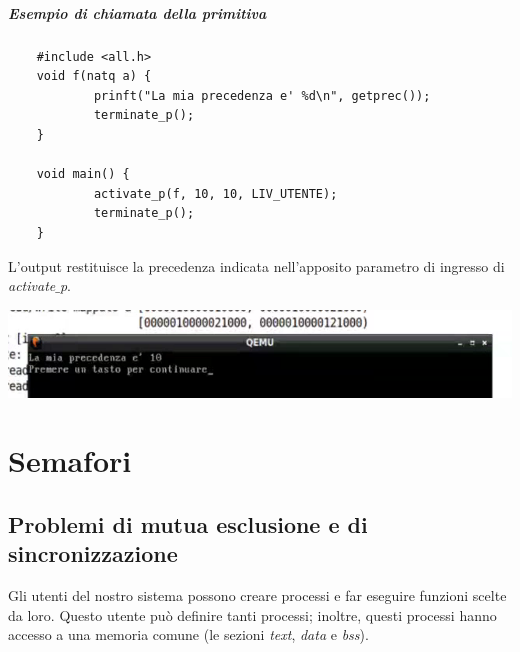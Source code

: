 \documentclass[11pt]{report}
\theoremstyle{definition}
\begin{document}
\paragraph{Esempio di chiamata della primitiva}
\begin{verbatim}
	#include <all.h>
	void f(natq a) {
		    prinft("La mia precedenza e' %d\n", getprec());
		    terminate_p();
	}
	
	void main() {
		    activate_p(f, 10, 10, LIV_UTENTE);
		    terminate_p();
	}
\end{verbatim}
L'output restituisce la precedenza indicata nell'apposito parametro di ingresso di \emph{activate$\_$p}.
\begin{center}\includegraphics[scale=.95]{img/191.PNG}\end{center}

\chapter{Semafori}
\section{Problemi di mutua esclusione e di sincronizzazione}
Gli utenti del nostro sistema possono creare processi e far eseguire funzioni scelte da loro. Questo utente può definire tanti processi; inoltre, questi processi hanno accesso a una memoria comune (le sezioni \emph{text}, \emph{data} e \emph{bss}).
\end{document}
